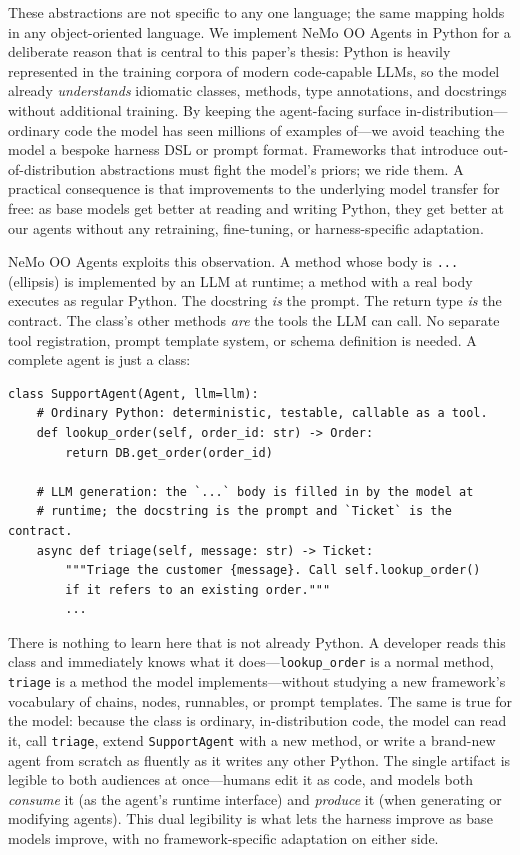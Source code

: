 \documentclass[11pt, logo, onecolumn, copyright, colorlinks=true, allcolors=blue]{nvidiatechreport}
\begin{document}
These abstractions are not specific to any one language; the same mapping holds
in any object-oriented language. We implement NeMo OO Agents in Python for a
deliberate reason that is central to this paper's thesis: Python is heavily
represented in the training corpora of modern code-capable LLMs, so the model
already \emph{understands} idiomatic classes, methods, type annotations, and
docstrings without additional training. By keeping the agent-facing surface
in-distribution---ordinary code the model has seen millions of examples of---we
avoid teaching the model a bespoke harness DSL or prompt format. Frameworks that
introduce out-of-distribution abstractions must fight the model's priors; we ride
them. A practical consequence is that improvements to the underlying model
transfer for free: as base models get better at reading and writing Python, they
get better at our agents without any retraining, fine-tuning, or harness-specific
adaptation.

NeMo OO Agents exploits this observation. A method whose body is \texttt{...}
(ellipsis) is implemented by an LLM at runtime; a method with a real body
executes as regular Python. The docstring \emph{is} the prompt. The return type
\emph{is} the contract. The class's other methods \emph{are} the tools the LLM
can call. No separate tool registration, prompt template system, or schema
definition is needed. A complete agent is just a class:

\begin{lstlisting}
class SupportAgent(Agent, llm=llm):
    # Ordinary Python: deterministic, testable, callable as a tool.
    def lookup_order(self, order_id: str) -> Order:
        return DB.get_order(order_id)

    # LLM generation: the `...` body is filled in by the model at
    # runtime; the docstring is the prompt and `Ticket` is the contract.
    async def triage(self, message: str) -> Ticket:
        """Triage the customer {message}. Call self.lookup_order()
        if it refers to an existing order."""
        ...
\end{lstlisting}

There is nothing to learn here that is not already Python. A developer reads this
class and immediately knows what it does---\texttt{lookup\_order} is a normal
method, \texttt{triage} is a method the model implements---without studying a new
framework's vocabulary of chains, nodes, runnables, or prompt templates. The same
is true for the model: because the class is ordinary, in-distribution code, the
model can read it, call \texttt{triage}, extend \texttt{SupportAgent} with a new
method, or write a brand-new agent from scratch as fluently as it writes any other
Python. The single artifact is legible to both audiences at once---humans edit it
as code, and models both \emph{consume} it (as the agent's runtime interface) and
\emph{produce} it (when generating or modifying agents). This dual legibility is
what lets the harness improve as base models improve, with no framework-specific
adaptation on either side.
\end{document}
